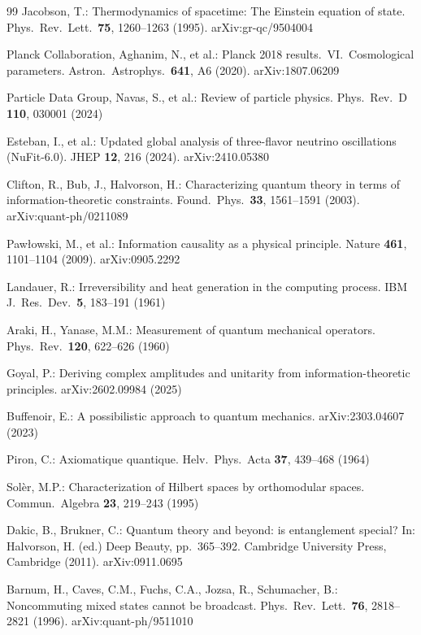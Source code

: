 \documentclass[11pt]{article}
\theoremstyle{remark}
\begin{document}
\begin{thebibliography}{99}
 Jacobson, T.: Thermodynamics of spacetime: The Einstein equation of state. Phys.\ Rev.\ Lett.\ \textbf{75}, 1260--1263 (1995). arXiv:gr-qc/9504004

 Planck Collaboration, Aghanim, N., et al.: Planck 2018 results.\ VI.\ Cosmological parameters. Astron.\ Astrophys.\ \textbf{641}, A6 (2020). arXiv:1807.06209

 Particle Data Group, Navas, S., et al.: Review of particle physics. Phys.\ Rev.\ D \textbf{110}, 030001 (2024)

 Esteban, I., et al.: Updated global analysis of three-flavor neutrino oscillations (NuFit-6.0). JHEP \textbf{12}, 216 (2024). arXiv:2410.05380

 Clifton, R., Bub, J., Halvorson, H.: Characterizing quantum theory in terms of information-theoretic constraints. Found.\ Phys.\ \textbf{33}, 1561--1591 (2003). arXiv:quant-ph/0211089

 Paw{\l}owski, M., et al.: Information causality as a physical principle. Nature \textbf{461}, 1101--1104 (2009). arXiv:0905.2292

 Landauer, R.: Irreversibility and heat generation in the computing process. IBM J.\ Res.\ Dev.\ \textbf{5}, 183--191 (1961)

 Araki, H., Yanase, M.M.: Measurement of quantum mechanical operators. Phys.\ Rev.\ \textbf{120}, 622--626 (1960)

 Goyal, P.: Deriving complex amplitudes and unitarity from information-theoretic principles. arXiv:2602.09984 (2025)

 Buffenoir, E.: A possibilistic approach to quantum mechanics. arXiv:2303.04607 (2023)

 Piron, C.: Axiomatique quantique. Helv.\ Phys.\ Acta \textbf{37}, 439--468 (1964)

 Sol\`{e}r, M.P.: Characterization of Hilbert spaces by orthomodular spaces. Commun.\ Algebra \textbf{23}, 219--243 (1995)

 Dakic, B., Brukner, C.: Quantum theory and beyond: is entanglement special? In: Halvorson, H. (ed.) Deep Beauty, pp.\ 365--392. Cambridge University Press, Cambridge (2011). arXiv:0911.0695

 Barnum, H., Caves, C.M., Fuchs, C.A., Jozsa, R., Schumacher, B.: Noncommuting mixed states cannot be broadcast. Phys.\ Rev.\ Lett.\ \textbf{76}, 2818--2821 (1996). arXiv:quant-ph/9511010


\end{thebibliography}
\end{document}
